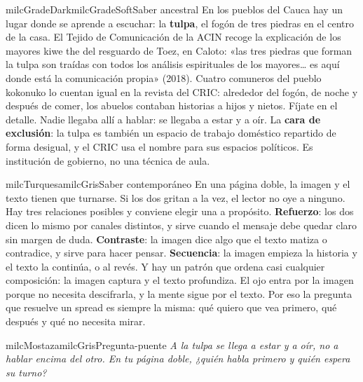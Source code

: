 \documentclass[11pt,letterpaper]{article}
\begin{document}
\begin{softbox}{milcGradeDark}{milcGradeSoft}{Saber ancestral}
En los pueblos del Cauca hay un lugar donde se aprende a escuchar: la \textbf{tulpa}, el fogón de tres piedras en el centro de la casa. El Tejido de Comunicación de la ACIN recoge la explicación de los mayores kiwe the del resguardo de Toez, en Caloto: «las tres piedras que forman la tulpa son traídas con todos los análisis espirituales de los mayores… es aquí donde está la comunicación propia» (2018). Cuatro comuneros del pueblo kokonuko lo cuentan igual en la revista del CRIC: alrededor del fogón, de noche y después de comer, los abuelos contaban historias a hijos y nietos. Fíjate en el detalle. Nadie llegaba allí a hablar: se llegaba a estar y a oír. La \textbf{cara de exclusión}: la tulpa es también un espacio de trabajo doméstico repartido de forma desigual, y el CRIC usa el nombre para sus espacios políticos. Es institución de gobierno, no una técnica de aula.\par{}
\end{softbox}

\begin{softbox}{milcTurquesa}{milcGris}{Saber contemporáneo}
En una página doble, la imagen y el texto tienen que turnarse. Si los dos gritan a la vez, el lector no oye a ninguno. Hay tres relaciones posibles y conviene elegir una a propósito. \textbf{Refuerzo}: los dos dicen lo mismo por canales distintos, y sirve cuando el mensaje debe quedar claro sin margen de duda. \textbf{Contraste}: la imagen dice algo que el texto matiza o contradice, y sirve para hacer pensar. \textbf{Secuencia}: la imagen empieza la historia y el texto la continúa, o al revés. Y hay un patrón que ordena casi cualquier composición: la imagen captura y el texto profundiza. El ojo entra por la imagen porque no necesita descifrarla, y la mente sigue por el texto. Por eso la pregunta que resuelve un spread es siempre la misma: qué quiero que vea primero, qué después y qué no necesita mirar.
\end{softbox}

\begin{softbox}{milcMostaza}{milcGris}{Pregunta-puente}
\textit{A la tulpa se llega a estar y a oír, no a hablar encima del otro. En tu página doble, ¿quién habla primero y quién espera su turno?}
\end{softbox}
\end{document}
